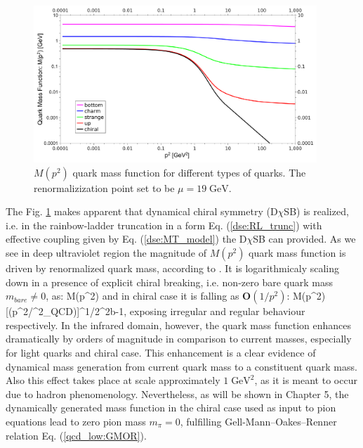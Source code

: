\begin{figure}
\tiny
 \begin{center}
  \includegraphics[width=0.95\textwidth]{figures/quark_M_functions}
 \end{center}
 \caption{\footnotesize $M(p^2)$ quark mass function for different types of quarks. The renormalizization point set to be $\mu=19\;\text{GeV}$. }\label{fig:quark_M_func} 
\end{figure}
The Fig. \ref{fig:quark_M_func} makes apparent that dynamical chiral symmetry (D$\chi$SB) is realized, i.e. in the rainbow-ladder truncation in a form Eq. (\ref{dse:RL_trunc}) with effective coupling given by Eq. (\ref{dse:MT_model}) the D$\chi$SB can provided. As we see in deep ultraviolet region the magnitude of $M(p^2)$ quark mass function is driven by renormalized quark mass, according to \cite{Miransky:1986ib}. It is logarithmicaly scaling down in a presence of explicit chiral breaking, i.e. non-zero bare quark mass $m_{bare}\neq 0$, as:
\beqa
	M(p^2) \approx {}
\eeqa
and in chiral case it is falling as $\mathbf{O}(1/p^2)$:
\beqa
	M(p^2) \approx {}[(p^2/\Lambda^2_{QCD})]^{1/2\pi^2b-1}\;,
\eeqa
exposing irregular and regular behaviour respectively. In the infrared domain, however, the quark mass function enhances dramatically by orders of magnitude in comparison to current masses, especially for light quarks and chiral case. This enhancement is a clear evidence of dynamical mass generation from current quark mass to a constituent quark mass. Also this effect takes place at scale approximately $1\; \text{GeV}^2$, as it is meant to occur due to hadron phenomenology. Nevertheless, as will be shown in Chapter 5, the dynamically generated mass function in the chiral case used as input to pion \BS equations lead to zero pion mass $m_\pi=0$, fulfilling Gell-Mann--Oakes--Renner relation Eq. (\ref{qcd_low:GMOR}). \\ 
